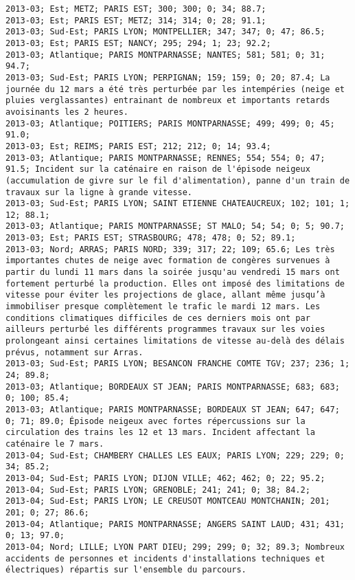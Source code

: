 \documentclass{article}
\begin{document}
\begin{Verbatim}[commandchars=\\\{\}]
2013-03; Est; METZ; PARIS EST; 300; 300; 0; 34; 88.7; 
2013-03; Est; PARIS EST; METZ; 314; 314; 0; 28; 91.1; 
2013-03; Sud-Est; PARIS LYON; MONTPELLIER; 347; 347; 0; 47; 86.5; 
2013-03; Est; PARIS EST; NANCY; 295; 294; 1; 23; 92.2; 
2013-03; Atlantique; PARIS MONTPARNASSE; NANTES; 581; 581; 0; 31; 94.7; 
2013-03; Sud-Est; PARIS LYON; PERPIGNAN; 159; 159; 0; 20; 87.4; La journée du 12 mars a été très perturbée par les intempéries (neige et pluies verglassantes) entrainant de nombreux et importants retards avoisinants les 2 heures.
2013-03; Atlantique; POITIERS; PARIS MONTPARNASSE; 499; 499; 0; 45; 91.0; 
2013-03; Est; REIMS; PARIS EST; 212; 212; 0; 14; 93.4; 
2013-03; Atlantique; PARIS MONTPARNASSE; RENNES; 554; 554; 0; 47; 91.5; Incident sur la caténaire en raison de l'épisode neigeux (accumulation de givre sur le fil d'alimentation), panne d'un train de travaux sur la ligne à grande vitesse.
2013-03; Sud-Est; PARIS LYON; SAINT ETIENNE CHATEAUCREUX; 102; 101; 1; 12; 88.1; 
2013-03; Atlantique; PARIS MONTPARNASSE; ST MALO; 54; 54; 0; 5; 90.7; 
2013-03; Est; PARIS EST; STRASBOURG; 478; 478; 0; 52; 89.1; 
2013-03; Nord; ARRAS; PARIS NORD; 339; 317; 22; 109; 65.6; Les très importantes chutes de neige avec formation de congères survenues à partir du lundi 11 mars dans la soirée jusqu'au vendredi 15 mars ont fortement perturbé la production. Elles ont imposé des limitations de vitesse pour éviter les projections de glace, allant même jusqu’à immobiliser presque complètement le trafic le mardi 12 mars. Les conditions climatiques difficiles de ces derniers mois ont par ailleurs perturbé les différents programmes travaux sur les voies prolongeant ainsi certaines limitations de vitesse au-delà des délais prévus, notamment sur Arras.
2013-03; Sud-Est; PARIS LYON; BESANCON FRANCHE COMTE TGV; 237; 236; 1; 24; 89.8; 
2013-03; Atlantique; BORDEAUX ST JEAN; PARIS MONTPARNASSE; 683; 683; 0; 100; 85.4; 
2013-03; Atlantique; PARIS MONTPARNASSE; BORDEAUX ST JEAN; 647; 647; 0; 71; 89.0; Épisode neigeux avec fortes répercussions sur la circulation des trains les 12 et 13 mars. Incident affectant la caténaire le 7 mars.
2013-04; Sud-Est; CHAMBERY CHALLES LES EAUX; PARIS LYON; 229; 229; 0; 34; 85.2; 
2013-04; Sud-Est; PARIS LYON; DIJON VILLE; 462; 462; 0; 22; 95.2; 
2013-04; Sud-Est; PARIS LYON; GRENOBLE; 241; 241; 0; 38; 84.2; 
2013-04; Sud-Est; PARIS LYON; LE CREUSOT MONTCEAU MONTCHANIN; 201; 201; 0; 27; 86.6; 
2013-04; Atlantique; PARIS MONTPARNASSE; ANGERS SAINT LAUD; 431; 431; 0; 13; 97.0; 
2013-04; Nord; LILLE; LYON PART DIEU; 299; 299; 0; 32; 89.3; Nombreux accidents de personnes et incidents d'installations techniques et électriques) répartis sur l'ensemble du parcours.

\end{Verbatim}
\end{document}
